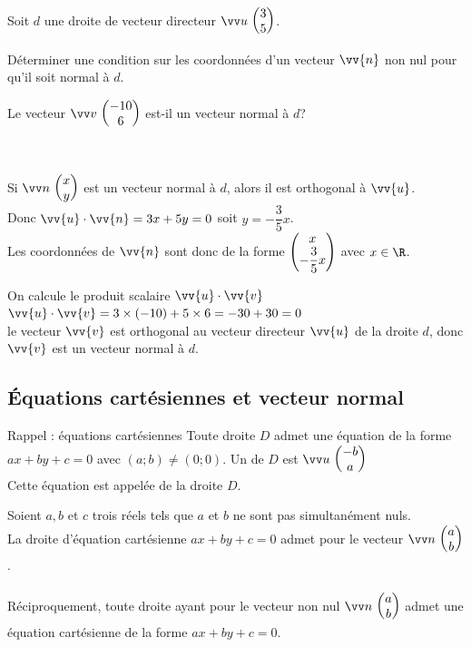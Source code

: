     \begin{methode}
        \\
        Soit $d$ une droite de vecteur directeur $\Coord{u}{3}{5}$.
        \begin{enumMet}
            \item Déterminer une condition sur les coordonnées d'un vecteur $\vv{n}$ non nul pour qu'il soit normal à $d$.
            \item Le vecteur $\Coord{v}{-10}{6}$ est-il un vecteur normal à $d$?
        \end{enumMet}
        
        \\
        \begin{enumMet}
            \item Si $\Coord{n}{x}{y}$ est un vecteur normal à $d$, alors il est orthogonal à $\vv{u}$.\\
            Donc $\vv{u} \cdot \vv{n}=3 x+5 y=0$ soit $y=-\dfrac{3}{5} x$.\\
            Les coordonnées de $\vv{n}$ sont donc de la forme $\begin{pmatrix} x\\ -\dfrac{3}{5}x \end{pmatrix}$ avec $x \in \R$.
            \item On calcule le produit scalaire $\vv{u}\cdot\vv{v}$\\
            $\vv{u}\cdot\vv{v}=3\times(-10)+5\times6=-30+30=0$\\
            le vecteur $\vv{v}$ est orthogonal au vecteur directeur $\vv{u}$ de la droite $d$, donc $\vv{v}$ est un vecteur normal à $d$. 
        \end{enumMet}
    \end{methode}
    
    \subsection{Équations cartésiennes et vecteur normal}
    
    \begin{proprieteTitre}{Rappel : équations cartésiennes}
        Toute droite $D$ admet une équation de la forme $a x+b y+c=0$ avec $(a ; b) \neq(0 ; 0) .$ Un  de $D$ est $\Coord{u}{-b}{a}$ \\
        Cette équation est appelée  de la droite $D$.
    \end{proprieteTitre}
        
    \begin{propriete}
        Soient $a, b$ et $c$ trois réels tels que $a$ et $b$ ne sont pas simultanément nuls.\\
        La droite d'équation cartésienne $a x+b y+c=0$ admet pour  le vecteur $\Coord{n}{a}{b}$.\\
        \ \\
        Réciproquement, toute droite ayant pour  le vecteur non nul $\Coord{n}{a}{b}$ admet une équation cartésienne de la forme $a x+b y+c=0$.
    \end{propriete}
        
